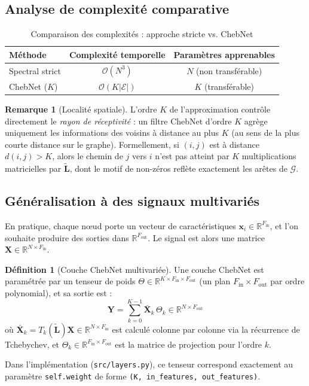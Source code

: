 \documentclass[12pt, a4paper]{article}
\theoremstyle{definition}
\newtheorem{definition}[theorem]{Définition}
\newtheorem{remark}[theorem]{Remarque}
\newcommand{\R}{\mathbb{R}}
\newcommand{\calG}{\mathcal{G}}
\newcommand{\calE}{\mathcal{E}}
\newcommand{\mat}[1]{\mathbf{#1}}
\newcommand{\Lt}{\tilde{\mat{L}}}
\newcommand{\x}{\mathbf{x}}
\begin{document}
\subsection{Analyse de complexité comparative}

\begin{table}[h!]
\centering
\caption{Comparaison des complexités : approche stricte vs. ChebNet}
\label{tab:complexity}
\begin{tabular}{@{} l c c @{}}
\toprule
\textbf{Méthode} & \textbf{Complexité temporelle} & \textbf{Paramètres apprenables} \\
\midrule
Spectral strict  & $\mathcal{O}(N^3)$            & $N$ (non transférable) \\
ChebNet ($K$)    & $\mathcal{O}(K |\calE|)$       & $K$ (transférable) \\
\bottomrule
\end{tabular}
\end{table}

\begin{remark}[Localité spatiale]
L'ordre $K$ de l'approximation contrôle directement le \emph{rayon de réceptivité} :
un filtre ChebNet d'ordre $K$ agrège uniquement les informations des voisins
à distance au plus $K$ (au sens de la plus courte distance sur le graphe).
Formellement, si $(i,j)$ est à distance $d(i,j) > K$, alors le chemin de $j$ vers $i$
n'est pas atteint par $K$ multiplications matricielles par $\Lt$,
dont le motif de non-zéros reflète exactement les arêtes de $\calG$.
\end{remark}

\subsection{Généralisation à des signaux multivariés}

En pratique, chaque nœud porte un vecteur de caractéristiques $\x_i \in \R^{F_{\text{in}}}$,
et l'on souhaite produire des sorties dans $\R^{F_{\text{out}}}$.
Le signal est alors une matrice $\mat{X} \in \R^{N \times F_{\text{in}}}$.

\begin{definition}[Couche ChebNet multivariée]
\label{def:chebnet_layer}
Une couche ChebNet est paramétrée par un tenseur de poids
$\Theta \in \R^{K \times F_{\text{in}} \times F_{\text{out}}}$
(un plan $F_{\text{in}} \times F_{\text{out}}$ par ordre polynomial), et sa sortie est :
\[
  \mat{Y} = \sum_{k=0}^{K-1} \bar{\mat{X}}_k\, \Theta_k
  \in \R^{N \times F_{\text{out}}}
\]
où $\bar{\mat{X}}_k = T_k(\Lt)\mat{X} \in \R^{N \times F_{\text{in}}}$
est calculé colonne par colonne via la récurrence de Tchebychev,
et $\Theta_k \in \R^{F_{\text{in}} \times F_{\text{out}}}$ est la matrice de projection
pour l'ordre $k$.

Dans l'implémentation (\texttt{src/layers.py}), ce tenseur correspond exactement au
paramètre \texttt{self.weight} de forme \texttt{(K, in\_features, out\_features)}.
\end{definition}
\end{document}

